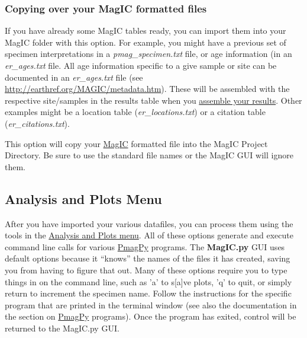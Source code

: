 \documentclass[11pt]{book}
\begin{document}
{\begin{itemize}
\end{itemize}


\subsubsection{Copying over your MagIC formatted files}
If you have already some MagIC tables ready,  you can import them into your MagIC folder with this option.  For example, you might have a previous set of specimen interpretations in a {\it pmag\_specimen.txt} file, or age information (in an {\it er\_ages.txt} file.  All age information specific to a give sample or site can be documented in an {\it er\_ages.txt} file (see \url{http://earthref.org/MAGIC/metadata.htm}).  These will be assembled with the respective site/samples in the results table when you \href{#PrepareMagicConsole}{assemble your results}. Other examples might be a location table ({\it er\_locations.txt}) or a citation table ({\it er\_citations.txt}).  

 This option will copy your \href{#DataTables}{MagIC} formatted file into the MagIC Project Directory.  Be sure to use the standard file names or the MagIC GUI will ignore them.  

\subsection{Analysis and Plots Menu}

After you have imported your various datafiles, you can process them using the tools in the \href{#AnalysisPlotsMenu}{Analysis and Plots menu}.    All of these options generate and execute command line calls for various \href{#PmagPy}{PmagPy} programs.  The {\bf MagIC.py} GUI uses default options because it ``knows'' the names of the files it has created, saving you from having to figure that out.   Many of these options require you to type things in on the command line, such as 'a' to s[a]ve plots, 'q' to quit, or simply return to increment the specimen name.  Follow the instructions for the specific program that are printed  in the terminal window   (see also the documentation in the section on \href{#PmagPy}{PmagPy} programs). Once the program has exited, control will be returned to the MagIC.py GUI.  

}
\end{document}
